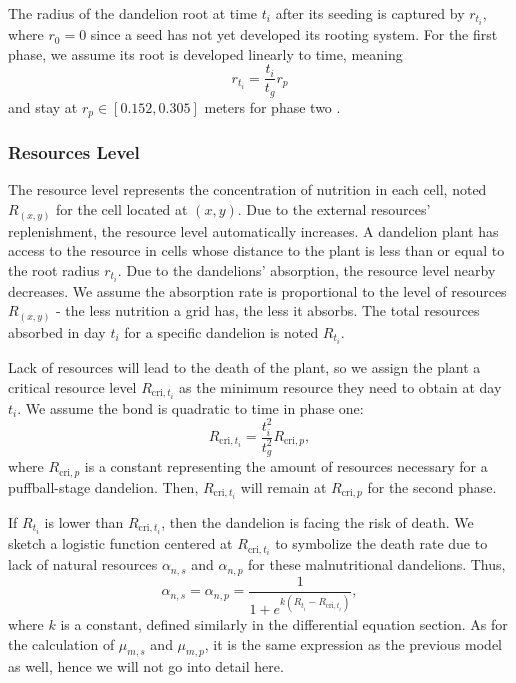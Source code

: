 \documentclass[12pt]{article}
\begin{document}
The radius of the dandelion root at time $t_i$ after its seeding is captured by $r_{t_i}$, where $r_0=0$ since a seed has not yet developed its rooting system. For the first phase, we assume its root is developed linearly to time, meaning
\begin{equation}
    r_{t_i}=\frac{t_i}{t_g}r_p
\end{equation}
and stay at $r_p\in [0.152, 0.305]$ meters for phase two \cite{mahr_dandelion_nodate}.

\subsubsection{Resources Level}
The resource level represents the concentration of nutrition in each cell, noted $R_{(x,y)}$ for the cell located at $(x,y)$. Due to the external resources' replenishment, the resource level automatically increases. A dandelion plant has access to the resource in cells whose distance to the plant is less than or equal to the root radius $r_{t_i}$. Due to the dandelions' absorption, the resource level nearby decreases. We assume the absorption rate is proportional to the level of resources $R_{(x,y)}$ - the less nutrition a grid has, the less it absorbs. The total resources absorbed in day $t_i$ for a specific dandelion is noted $R_{t_i}$.

Lack of resources will lead to the death of the plant, so we assign the plant a critical resource level $R_{\text{cri},t_i}$ as the minimum resource they need to obtain at day $t_i$. We assume the bond is quadratic to time in phase one:
\begin{equation}
    R_{\text{cri},t_i}= \frac {t_i^2}{t_g^2}R_{\text{cri},p},
\end{equation}
where $R_{\text{cri},p}$ is a constant representing the amount of resources necessary for a puffball-stage dandelion. Then, $R_{\text{cri},t_i}$ will remain at $R_{\text{cri},p}$ for the second phase.

If $R_{t_i}$ is lower than $R_{\text{cri},t_i}$, then the dandelion is facing the risk of death. We sketch a logistic function centered at $R_{\text{cri},t_i}$ to symbolize the death rate due to lack of natural resources $\alpha_{n,s}$ and $\alpha_{n,p}$ for these malnutritional dandelions. Thus,
\begin{equation}
    \alpha_{n,s}=\alpha_{n,p}=\frac{1}{1+e^{k\left(R_{t_i}-R_{\text{cri},t_i}\right)}},
\end{equation}
where \(k\) is a constant, defined similarly in the differential equation section. As for the calculation of $\mu_{m,s}$ and $\mu_{m,p}$, it is the same expression as the previous model as well, hence we will not go into detail here.
\end{document}
